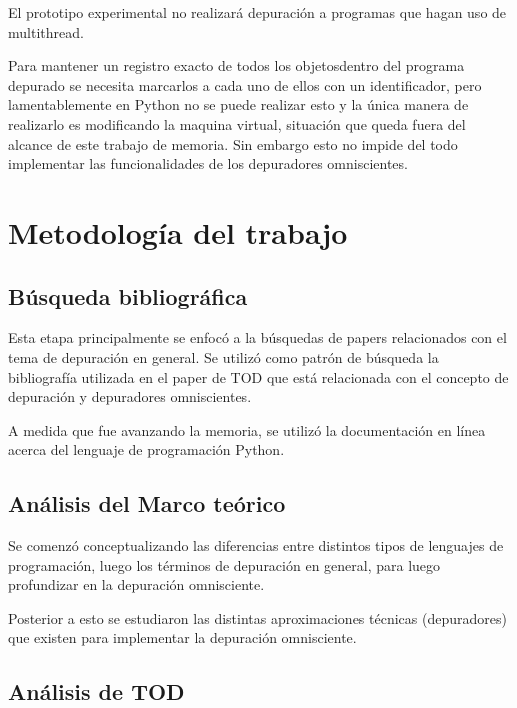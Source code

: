 \documentclass[12pt,legalpaper]{report}
\begin{document}
El prototipo experimental no realizará depuración a programas que hagan uso de multithread.

    Para mantener un registro exacto de todos los objetos\footnotemark[1] dentro del programa depurado se necesita marcarlos a cada uno de ellos con un identificador, pero lamentablemente en Python no se puede realizar esto y la única manera de realizarlo es modificando la maquina virtual, situación que queda fuera del alcance de este trabajo de memoria.  Sin embargo esto no impide del todo implementar las funcionalidades de los depuradores omniscientes.


\chapter{Metodología del trabajo}
	\section{Búsqueda bibliográfica}

Esta etapa principalmente se enfocó a la búsquedas de papers relacionados con el tema de depuración en general.  Se utilizó como patrón de búsqueda la bibliografía utilizada en el paper de TOD \cite{tod} que está relacionada con el concepto de depuración y depuradores omniscientes.

A medida que fue avanzando la memoria, se utilizó la documentación en línea acerca del lenguaje de programación Python.

	\section{Análisis del Marco teórico}

Se comenzó conceptualizando las diferencias entre distintos tipos de lenguajes de programación, luego los términos de depuración en general, para luego profundizar en la depuración omnisciente.

Posterior a esto se estudiaron las distintas aproximaciones técnicas (depuradores) que existen para implementar la depuración omnisciente.


	\section{Análisis de TOD}
\end{document}
